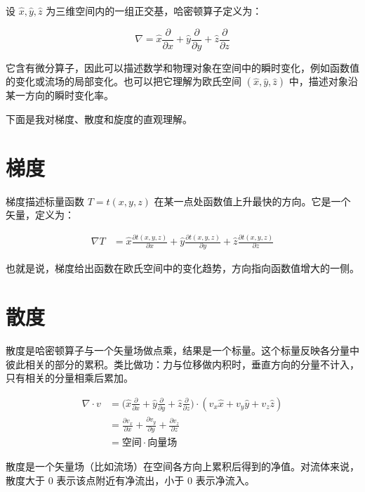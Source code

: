 设 \(\hat{x},\hat{y},\hat{z}\) 为三维空间内的一组正交基，哈密顿算子定义为：

\[
\nabla=\hat{x}\frac{\partial}{\partial x} + \hat{y}\frac{\partial}{\partial y} + \hat{z}\frac{\partial}{\partial z}
\]

它含有微分算子，因此可以描述数学和物理对象在空间中的瞬时变化，例如函数值的变化或流场的局部变化。也可以把它理解为欧氏空间 \((\hat{x},\hat{y},\hat{z})\) 中，描述对象沿某一方向的瞬时变化率。

下面是我对梯度、散度和旋度的直观理解。

\section{梯度}

梯度描述标量函数 \(T=t(x,y,z)\) 在某一点处函数值上升最快的方向。它是一个矢量，定义为：

\begin{align}
\nabla T 
&=\hat{x}\frac{\partial t(x,y,z)}{\partial x} + \hat{y}\frac{\partial t(x,y,z)}{\partial y} + \hat{z}\frac{\partial t(x,y,z)}{\partial z}
\end{align}

也就是说，梯度给出函数在欧氏空间中的变化趋势，方向指向函数值增大的一侧。

\section{散度}

散度是哈密顿算子与一个矢量场做点乘，结果是一个标量。这个标量反映各分量中彼此相关的部分的累积。类比做功：力与位移做内积时，垂直方向的分量不计入，只有相关的分量相乘后累加。

\begin{align}
\nabla \cdot v &=\big(\hat{x}\frac{\partial}{\partial x} + \hat{y}\frac{\partial}{\partial y} + \hat{z}\frac{\partial}{\partial z}\big)\cdot (v_x\hat{x}+v_y\hat{y}+v_z\hat{z}) \\
&= \frac{\partial v_x}{\partial x}+ \frac{\partial v_y}{\partial y} + \frac{\partial v_z}{\partial z}\\
&=空间 \cdot 向量场
\end{align}

散度是一个矢量场（比如流场）在空间各方向上累积后得到的净值。对流体来说，散度大于 0 表示该点附近有净流出，小于 0 表示净流入。

